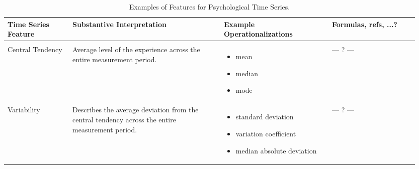 \begin{sidewaystable*}[!hbtp]
    \centering
    \caption{Examples of Features for Psychological Time Series.}
    \label{tab:esmFeatures} 
    \begin{tabular}{
    >{\raggedright\arraybackslash}p{0.15\linewidth} 
    >{\raggedright\arraybackslash}p{0.35\linewidth} 
    >{\raggedright\arraybackslash}p{0.25\linewidth} 
    >{\raggedright\arraybackslash}p{0.20\linewidth}
    }
        \hline 
        Time Series Feature & Substantive Interpretation & Example Operationalizations & Formulas, refs, ...? \\ 
        \hline \\ [-0.5em]
        
        
        Central Tendency \linebreak & 
        Average level of the experience across the entire measurement period. \linebreak & 
        \vspace{-1em}
        \begin{itemize}[nosep,leftmargin=*,label={--}]
            \item mean
            \item median
            \item mode
        \end{itemize} \linebreak  & 
        {\centering --- ? ---\par} \\ 
        
        Variability & 
        Describes the average deviation from the central tendency across the entire measurement period. \linebreak & 
        \vspace{-1em}
        \begin{itemize}[nosep,leftmargin=*,label={--}]
            \item standard deviation
            \item variation coefficient
            \item median absolute deviation
        \end{itemize} \linebreak & 
        {\centering --- ? ---\par} \\ 
        

\end{tabular}
\end{sidewaystable*}
